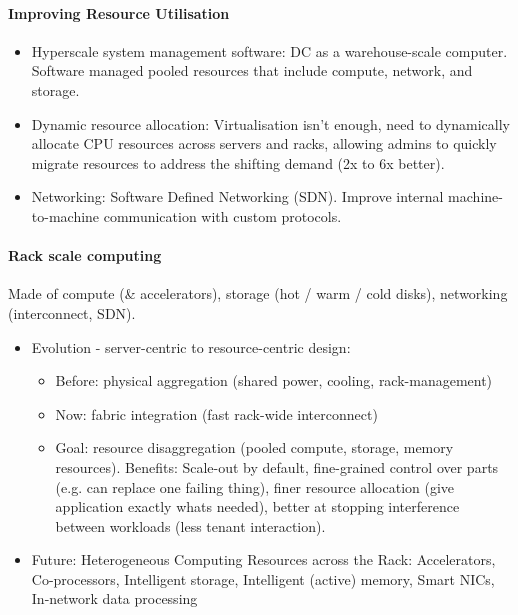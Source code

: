 \paragraph{Improving Resource Utilisation}
\begin{itemize}
\item Hyperscale system management software: DC as a warehouse-scale computer.
  Software managed pooled resources that include compute, network, and
  storage.
\item Dynamic resource allocation: Virtualisation isn't enough, need to
  dynamically allocate CPU resources across servers and racks, allowing admins
  to quickly migrate resources to address the shifting demand (2x to 6x better).
\item Networking: Software Defined Networking (SDN). Improve internal
  machine-to-machine communication with custom protocols.
\end{itemize}

\paragraph{Rack scale computing} Made of compute (\& accelerators), storage
(hot / warm / cold disks), networking (interconnect, SDN).
\begin{itemize}
\item Evolution - server-centric to resource-centric design: 
  \begin{itemize}
    \item Before: physical aggregation (shared power, cooling, rack-management)
    \item Now: fabric integration (fast rack-wide interconnect)
    \item Goal: resource disaggregation (pooled compute, storage, memory
  resources). Benefits: Scale-out by default, fine-grained control over parts (e.g. can replace one failing thing), finer resource allocation (give application exactly whats needed), better at stopping interference between workloads (less tenant interaction).
  \end{itemize}
\item Future: Heterogeneous Computing Resources across the Rack: Accelerators,
  Co-processors, Intelligent storage, Intelligent (active) memory, Smart NICs,
  In-network data processing
\end{itemize}
